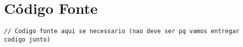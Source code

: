 \documentclass[a4paper,10pt]{article}
\begin{document}

\newpage

\section{Código Fonte}
\lstset{language=go, breaklines=true, basicstyle=\ttfamily\footnotesize}
\begin{lstlisting}
// Codigo fonte aqui se necessario (nao deve ser pq vamos entregar codigo junto)
\end{lstlisting}
\end{document}
